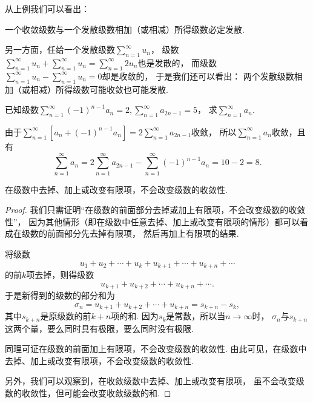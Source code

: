 从上例我们可以看出：
\begin{proposition}\label{theorem:无穷级数.收敛级数性质2.推论1}
一个收敛级数与一个发散级数相加（或相减）所得级数必定发散.
\end{proposition}

另一方面，任给一个发散级数\(\sum_{n=1}^\infty u_n\)，
级数\(\sum_{n=1}^\infty u_n + \sum_{n=1}^\infty u_n
= \sum_{n=1}^\infty 2 u_n\)也是发散的，
而级数\(\sum_{n=1}^\infty u_n - \sum_{n=1}^\infty u_n
= 0\)却是收敛的，
于是我们还可以看出：
{\color{red}两个发散级数相加（或相减）所得级数可能收敛也可能发散.}

\begin{example}
已知级数\(\sum_{n=1}^\infty (-1)^{n-1} a_n = 2,
\sum_{n=1}^\infty a_{2n-1} = 5\)，
求\(\sum_{n=1}^\infty a_n\).
\begin{solution}
由于\(\sum_{n=1}^\infty [a_n + (-1)^{n-1} a_n]
= 2 \sum_{n=1}^\infty a_{2n-1}\)收敛，
所以\(\sum_{n=1}^\infty a_n\)收敛，且有
\[
\sum_{n=1}^\infty a_n
= 2 \sum_{n=1}^\infty a_{2n-1}
- \sum_{n=1}^\infty (-1)^{n-1} a_n
= 10 - 2 = 8.
\]
\end{solution}
\end{example}

\begin{property}\label{theorem:无穷级数.收敛级数性质3}
在级数中去掉、加上或改变有限项，不会改变级数的收敛性.
\begin{proof}
我们只需证明“在级数的前面部分去掉或加上有限项，不会改变级数的收敛性”，
因为其他情形（即在级数中任意去掉、加上或改变有限项的情形）都可以看成在级数的前面部分先去掉有限项，
然后再加上有限项的结果.

将级数\[
u_1+u_2+\dotsb+u_k+u_{k+1}+\dotsb+u_{k+n}+\dotsb
\]的前\(k\)项去掉，则得级数\[
u_{k+1}+u_{k+2}+\dotsb+u_{k+n}+\dotsb.
\]于是新得到的级数的部分和为\[
\sigma_n = u_{k+1}+u_{k+2}+\dotsb+u_{k+n} = s_{k+n} - s_k,
\]其中\(s_{k+n}\)是原级数的前\(k+n\)项的和.
因为\(s_k\)是常数，所以当\(n\to\infty\)时，
\(\sigma_n\)与\(s_{k+n}\)这两个量，要么同时具有极限，要么同时没有极限.

同理可证在级数的前面加上有限项，不会改变级数的收敛性.
由此可见，在级数中去掉、加上或改变有限项，不会改变级数的收敛性.

另外，我们可以观察到，在收敛级数中去掉、加上或改变有限项，
虽不会改变级数的收敛性，但可能会改变收敛级数的和.
\end{proof}
\end{property}

